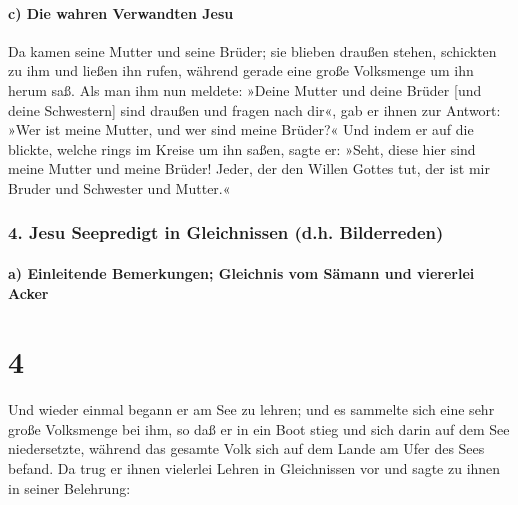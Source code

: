 \hypertarget{c-die-wahren-verwandten-jesu}{%
\paragraph{c) Die wahren Verwandten
Jesu}\label{c-die-wahren-verwandten-jesu}}

 Da kamen seine Mutter und seine Brüder; sie blieben
draußen stehen, schickten zu ihm und ließen ihn rufen, 
während gerade eine große Volksmenge um ihn herum saß. Als man ihm nun
meldete: »Deine Mutter und deine Brüder {[}und deine Schwestern{]} sind
draußen und fragen nach dir«,  gab er ihnen zur Antwort:
»Wer ist meine Mutter, und wer sind meine Brüder?«  Und
indem er auf die blickte, welche rings im Kreise um ihn saßen, sagte er:
»Seht, diese hier sind meine Mutter und meine Brüder! 
Jeder, der den Willen Gottes tut, der ist mir Bruder und Schwester und
Mutter.«

\hypertarget{jesu-seepredigt-in-gleichnissen-d.h.-bilderreden}{%
\subsubsection{4. Jesu Seepredigt in Gleichnissen (d.h.
Bilderreden)}\label{jesu-seepredigt-in-gleichnissen-d.h.-bilderreden}}

\hypertarget{a-einleitende-bemerkungen-gleichnis-vom-suxe4mann-und-viererlei-acker}{%
\paragraph{a) Einleitende Bemerkungen; Gleichnis vom Sämann und
viererlei
Acker}\label{a-einleitende-bemerkungen-gleichnis-vom-suxe4mann-und-viererlei-acker}}

\hypertarget{section-3}{%
\section{4}\label{section-3}}

 Und wieder einmal begann er am See zu lehren; und es
sammelte sich eine sehr große Volksmenge bei ihm, so daß er in ein Boot
stieg und sich darin auf dem See niedersetzte, während das gesamte Volk
sich auf dem Lande am Ufer des Sees befand.  Da trug er
ihnen vielerlei Lehren in Gleichnissen vor und sagte zu ihnen in seiner
Belehrung:

